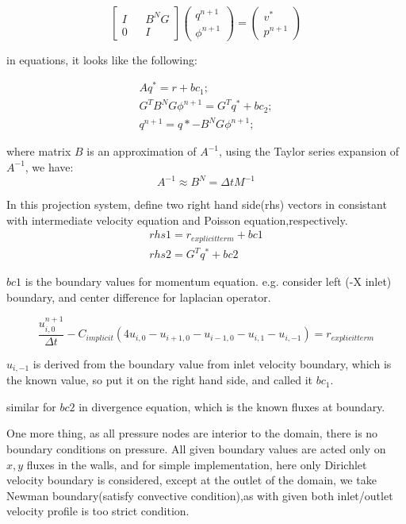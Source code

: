 \documentclass[11pt]{article}
\begin{document}
$$ 
\begin{bmatrix} I &&  B^NG \\ 0 && I \end{bmatrix} \begin{pmatrix} q^{n+1} \\ \phi ^{n+1} \end{pmatrix} = \left( \begin{array}{c} v^* \\ p^{n+1} \end{array} \right) $$

in equations, it looks like the following:

\begin{align}
	A q^* = r + bc_1;
	\\ G^TB^NG \phi ^{n+1} = G^Tq^* + bc_2 ;
  	\\ q^{n+1} = q* - B^NG \phi ^{n+1};
\end{align}

where matrix $B$ is an approximation of $A^{-1}$, using the Taylor series expansion of $A^{-1}$, we have:
	$$ A^{-1} \approx B^N = \Delta t M^{-1} $$

In this projection system, define two right hand side(rhs) vectors in consistant with intermediate velocity equation and Poisson equation,respectively. 
\begin{align}
	rhs1 = r_{explicit term} + bc1
\\	rhs2 = G^T q^* + bc2
 \end{align}

$bc1$ is the boundary values for momentum equation. e.g. consider left (-X inlet) boundary, and center difference for laplacian operator.

$$ \frac{u_{i,0}^{n+1}}{\Delta t} - C_{implicit} (4u_{i,0} - u_{i+1,0} - u_{i-1,0} - u_{i,1} - u_{i,-1}) = r_{explicit term} $$

$u_{i,-1}$ is derived from the boundary value from inlet velocity boundary, which is the known value, so put it on the right hand side, and called it $bc_1$.

similar for $bc2$ in divergence equation, which is the known fluxes at boundary.

One more thing, as all pressure nodes are interior to the domain, there is no boundary conditions on pressure. All given boundary values are acted only on $x,y$ fluxes in the walls, and for simple implementation, here only Dirichlet velocity boundary is considered, except at the outlet of the domain, we take Newman boundary(satisfy convective condition),as with given both inlet/outlet velocity profile is too strict condition. 
\end{document}
